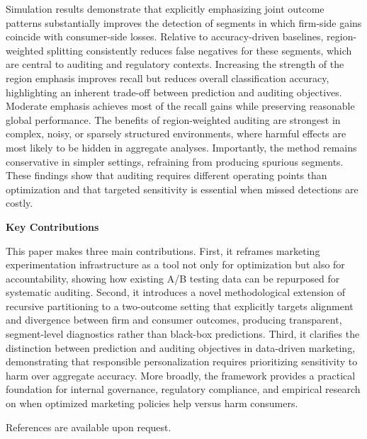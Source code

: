 \documentclass[12pt]{article}
\begin{document}
Simulation results demonstrate that explicitly emphasizing joint outcome patterns substantially improves the detection of segments in which firm-side gains coincide with consumer-side losses. Relative to accuracy-driven baselines, region-weighted splitting consistently reduces false negatives for these segments, which are central to auditing and regulatory contexts. Increasing the strength of the region emphasis improves recall but reduces overall classification accuracy, highlighting an inherent trade-off between prediction and auditing objectives. Moderate emphasis achieves most of the recall gains while preserving reasonable global performance. The benefits of region-weighted auditing are strongest in complex, noisy, or sparsely structured environments, where harmful effects are most likely to be hidden in aggregate analyses. Importantly, the method remains conservative in simpler settings, refraining from producing spurious segments. These findings show that auditing requires different operating points than optimization and that targeted sensitivity is essential when missed detections are costly.

\textbf{Key Contributions}

This paper makes three main contributions. First, it reframes marketing experimentation infrastructure as a tool not only for optimization but also for accountability, showing how existing A/B testing data can be repurposed for systematic auditing. Second, it introduces a novel methodological extension of recursive partitioning to a two-outcome setting that explicitly targets alignment and divergence between firm and consumer outcomes, producing transparent, segment-level diagnostics rather than black-box predictions. Third, it clarifies the distinction between prediction and auditing objectives in data-driven marketing, demonstrating that responsible personalization requires prioritizing sensitivity to harm over aggregate accuracy. More broadly, the framework provides a practical foundation for internal governance, regulatory compliance, and empirical research on when optimized marketing policies help versus harm consumers.

\vspace{1em}

References are available upon request.
\end{document}
